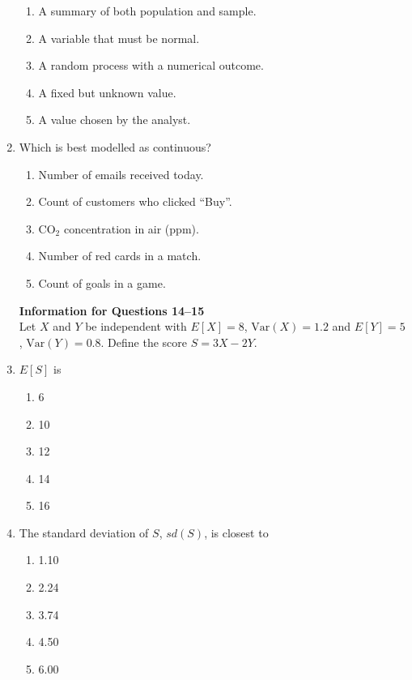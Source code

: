 \documentclass{article}
\begin{document}
\begin{enumerate}
    \begin{enumerate}[label=\Alph*.]
        \item A summary of both population and sample.
        \item A variable that must be normal.
        \item A random process with a numerical outcome.
        \item A fixed but unknown value.
        \item A value chosen by the analyst.
    \end{enumerate}
\item Which is best modelled as continuous?
    \begin{enumerate}[label=\Alph*.]
        \item Number of emails received today.
        \item Count of customers who clicked ``Buy''.
        \item CO$_2$ concentration in air (ppm).
        \item Number of red cards in a match.
        \item Count of goals in a game.
    \end{enumerate}

\textbf{Information for Questions 14--15}\\
Let $X$ and $Y$ be independent with $E[X]=8$, $\mathrm{Var}(X)=1.2$ and $E[Y]=5$, $\mathrm{Var}(Y)=0.8$. Define the score $S=3X-2Y$.
\item $E[S]$ is
    \begin{enumerate}[label=\Alph*.]
        \item 6
        \item 10
        \item 12
        \item 14
        \item 16
    \end{enumerate}
\item The standard deviation of $S$, $sd(S)$, is closest to
    \begin{enumerate}[label=\Alph*.]
        \item 1.10
        \item 2.24
        \item 3.74
        \item 4.50
        \item 6.00
    \end{enumerate}


\end{enumerate}
\end{document}
